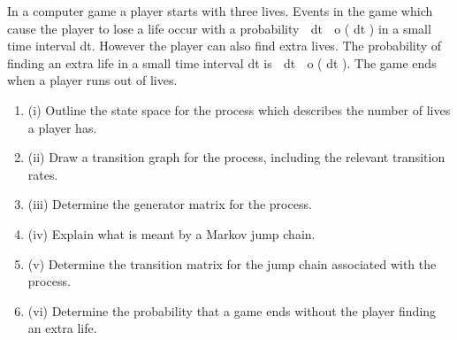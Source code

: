 \documentclass[a4paper,12pt]{article}
\begin{document}
In a computer game a player starts with three lives. Events in the game which cause
the player to lose a life occur with a probability  dt  o ( dt ) in a small time interval dt.
However the player can also find extra lives. The probability of finding an extra life
in a small time interval dt is  dt  o ( dt ). The game ends when a player runs out of
lives.
\begin{enumerate}
\item (i) Outline the state space for the process which describes the number of lives a
player has.
\item
(ii) Draw a transition graph for the process, including the relevant transition rates.
\item 
(iii) Determine the generator matrix for the process.
\item 
(iv) Explain what is meant by a Markov jump chain.
\item 
(v) Determine the transition matrix for the jump chain associated with the process.
\item 
(vi) Determine the probability that a game ends without the player finding an extra
life.
\end{enumerate}
\newpage
\end{document}
